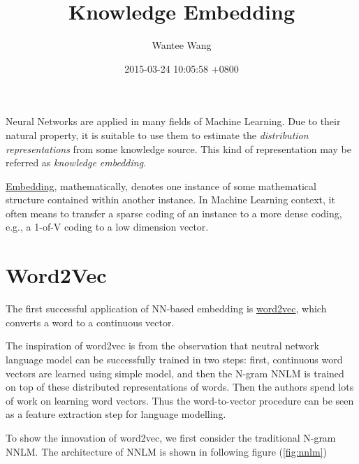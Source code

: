\documentclass[]{article}
\title{Knowledge Embedding}
\author{Wantee Wang}
\date{2015-03-24 10:05:58 +0800}
\begin{document}
\maketitle

Neural Networks are applied in many fields of Machine Learning. Due to
their natural property, it is suitable to use them to estimate the
\emph{distribution representations} from some knowledge source. This
kind of representation may be referred as \emph{knowledge embedding}.

\href{http://en.wikipedia.org/wiki/Embedding}{Embedding},
mathematically, denotes one instance of some mathematical structure
contained within another instance. In Machine Learning context, it often
means to transfer a sparse coding of an instance to a more dense coding,
e.g., a 1-of-V coding to a low dimension vector.

\section{Word2Vec}\label{word2vec}

The first successful application of NN-based embedding is
\href{https://code.google.com/p/word2vec/}{word2vec}, which converts a
word to a continuous vector.

The inspiration \cite{mikolov2013efficient} of word2vec is from the
observation that neutral network language model can be successfully
trained in two steps: first, continuous word vectors are learned using
simple model, and then the N-gram NNLM is trained on top of these
distributed representations of words. Then the authors spend lots of
work on learning word vectors. Thus the word-to-vector procedure can be
seen as a feature extraction step for language modelling.

To show the innovation of word2vec, we first consider the traditional
N-gram NNLM. The architecture of NNLM \cite{bengio2003neural} is shown
in following figure (\autoref{fig:nnlm})
\end{document}
